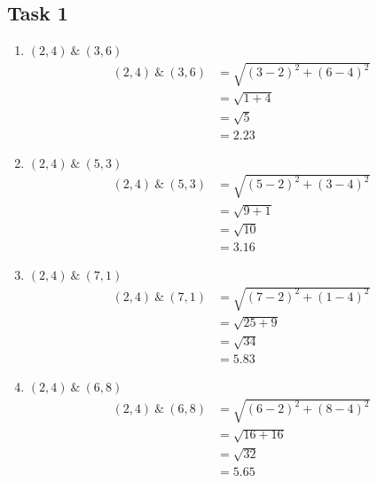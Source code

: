 \documentclass[12pt,titlepage]{article}
\begin{document}
\subsection{Task 1}
\begin{enumerate}
    \item {
        $(2, 4)~\&~(3, 6)$
        \begin{align*}
            (2, 4)~\&~(3, 6) &= \sqrt{(3 - 2)^2 + (6 - 4)^2} \\
            &= \sqrt{1 + 4} \\
            &= \sqrt{5} \\
            &= 2.23
        \end{align*}
    }
    \item {
        $(2, 4)~\&~(5, 3)$
        \begin{align*}
            (2, 4)~\&~(5, 3) &= \sqrt{(5 - 2)^2 + (3 - 4)^2} \\
            &= \sqrt{9 + 1} \\
            &= \sqrt{10} \\
            &= 3.16
        \end{align*}
    }
    \item {
        $(2, 4)~\&~(7, 1)$
        \begin{align*}
            (2, 4)~\&~(7, 1) &= \sqrt{(7 - 2)^2 + (1 - 4)^2} \\
            &= \sqrt{25 + 9} \\
            &= \sqrt{34} \\
            &= 5.83
        \end{align*}
    }
    \item {
        $(2, 4)~\&~(6, 8)$
        \begin{align*}
            (2, 4)~\&~(6, 8) &= \sqrt{(6 - 2)^2 + (8 - 4)^2} \\
            &= \sqrt{16 + 16} \\
            &= \sqrt{32} \\
            &= 5.65
        \end{align*}
    }
    \begin{center}
\end{center}
\end{enumerate}
\end{document}
